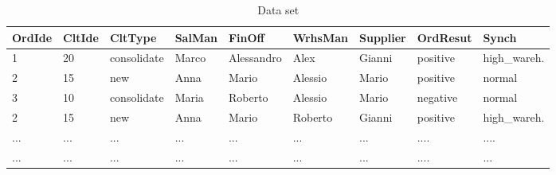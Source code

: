 \documentclass{llncs}
\begin{document}
\begin{table}[!h]
\scriptsize
\centering
\begin{tabular}{|p{1cm}|p{1cm}|p{}|p{1cm}|p{}|p{}|p{}|p{}|p{}|}
\hline OrdIde & CltIde & CltType & SalMan & FinOff & WrhsMan & Supplier & OrdResut & Synch\\
\hline
1 & 20 & consolidate & Marco & Alessandro & Alex & Gianni & positive & high\_wareh.\\
\hline
2 & 15 & new & Anna & Mario & Alessio & Mario & positive & normal\\
\hline
3 & 10 &consolidate & Maria & Roberto & Alessio & Mario & negative & normal\\
\hline
2 & 15 & new & Anna & Mario & Roberto & Gianni & positive & high\_wareh.\\
\hline
... & ... & ... & ... & ... & ... & ... & .... & .... \\
\hline
... & ... & ... & ... & ... & ... & ... & .... & ...  \\
\hline
\end{tabular}
\caption{Data set}
\label{tab:SaleDataPerf}
\end{table}
\normalsize
\end{document}
